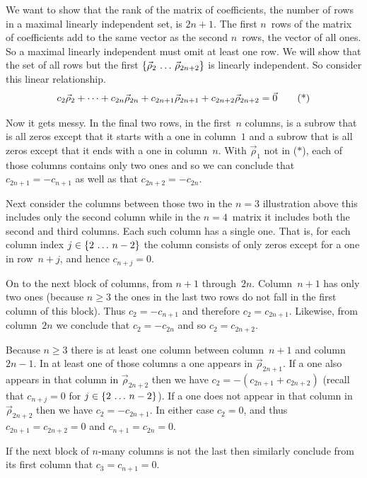 We want to show that the rank of the matrix of coefficients,
the number of rows in a maximal linearly independent set, is $2n+1$.
The first $n$~rows of the matrix of coefficients add to the same vector
as the second $n$~rows, the vector of all ones.
So a maximal linearly independent must omit at least one row.
We will show that the set of all rows but the first 
$\mbox{$\{\vec{\rho}_2\,\ldots\, \vec{\rho}_{2n+2}\}$}$
is linearly independent.
So consider this linear relationship.
\begin{equation*}
  c_2\vec{\rho}_2+\cdots+c_{2n}\vec{\rho}_{2n}
     +c_{2n+1}\vec{\rho}_{2n+1}+c_{2n+2}\vec{\rho}_{2n+2}=\vec{0}
   \tag{*}
\end{equation*}

Now it gets messy.
In the final two rows, in the first~$n$ columns, is a subrow that 
is all zeros except that it starts with a one in column~$1$
and a subrow that is all zeros except that it ends with a one
in column~$n$.
With $\vec{\rho}_1$ not in ($*$), each of those columns contains only 
two ones and so we can conclude that $c_{2n+1}=-c_{n+1}$ as well as that
$c_{2n+2}=-c_{2n}$.

Next consider the columns between those two\Dash
in the $n=3$ illustration above this includes only the second column while 
in the $n=4$~matrix it includes both the second and third columns.
Each such column has a single one.
That is, for each column index $j\in\mbox{$\{2\,\ldots\, n-2\}$}$
the column consists of only zeros except for a one in row~$n+j$, 
and hence $c_{n+j}=0$.

On to the next block of columns, from $n+1$ through~$2n$.
Column~$n+1$ has only two ones (because $n\geq 3$ the ones
in the last two rows do not fall in the first column of this
block). 
Thus $c_2=-c_{n+1}$
and therefore $c_2=c_{2n+1}$.
Likewise, from column~$2n$ we conclude that $c_2=-c_{2n}$
and so $c_2=c_{2n+2}$.  

Because $n\geq 3$
there is at least one column between column~$n+1$ and column~$2n-1$.
In at least one of those columns a one appears in $\vec{\rho}_{2n+1}$.
If a one also appears in that column in $\vec{\rho}_{2n+2}$ then we have 
$c_2=-(c_{2n+1}+c_{2n+2})$ 
(recall that $c_{n+j}=0$ for $j\in\mbox{$\{2\,\ldots\, n-2\}$}$).
If a one does not appear in that column in $\vec{\rho}_{2n+2}$
then we have $c_2=-c_{2n+1}$.
In either case $c_2=0$, and thus 
$c_{2n+1}=c_{2n+2}=0$ and  
$c_{n+1}=c_{2n}=0$.

If the next block of $n$-many columns is not the last then similarly
conclude from its 
first column that $c_3=c_{n+1}=0$.

